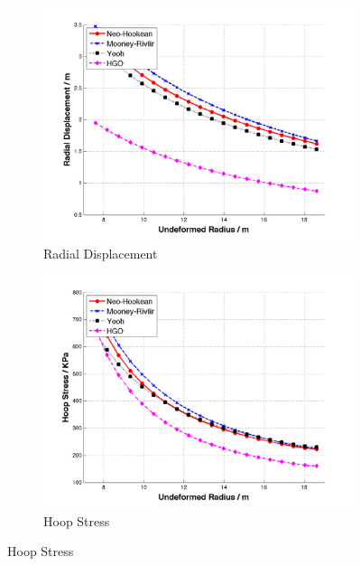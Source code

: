 \begin{figure}[t!p]
	\begin{subfigure}[b]{0.5\textwidth}
		\centering
		\includegraphics[width=\textwidth]{./figures/ur_models.png}
		\caption{Radial Displacement}
		\label{ur_models}
	\end{subfigure}
	\begin{subfigure}[b]{0.5\textwidth}
		\centering
		\includegraphics[width=\textwidth]{./figures/hoop_models.png}
		\caption{Hoop Stress}
		\label{hoop_models}
	\end{subfigure}
	

\end{figure}
